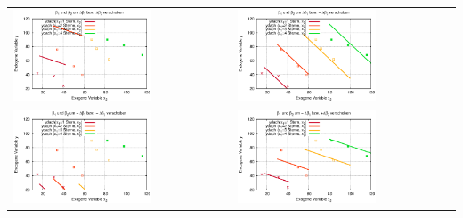 \documentclass[a4paper]{foils}
\begin{document}
\begin{landscape}
\begin{center}
\begin{tabular}{ll}
\includegraphics[width=0.65\textwidth]{figsRegr/hotel_scatterplot_x2ycondx1_notCal1.eps}
&
\includegraphics[width=0.65\textwidth]{figsRegr/hotel_scatterplot_x2ycondx1_notCal2.eps}
\\
\includegraphics[width=0.65\textwidth]{figsRegr/hotel_scatterplot_x2ycondx1_notCal3.eps}
&
\includegraphics[width=0.65\textwidth]{figsRegr/hotel_scatterplot_x2ycondx1_notCal4.eps}
\end{tabular}




\end{center}
\end{landscape}
\end{document}
